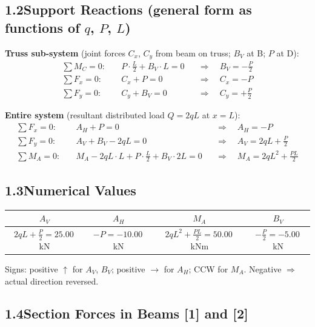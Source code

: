 \documentclass[a4paper,11pt]{article}
\begin{document}
\subsection*{1.2\quad Support Reactions (general form as functions of $q$, $P$, $L$)}

\textbf{Truss sub-system}
(joint forces $C_x$, $C_y$ from beam on truss; $B_V$ at B; $P$ at D):
\begin{align*}
  \sum M_C = 0:\quad & P \cdot \tfrac{L}{2} + B_V \cdot L = 0
    &&\Rightarrow\quad \boxed{B_V = -\tfrac{P}{2}} \\
  \sum F_x = 0:\quad & C_x + P = 0
    &&\Rightarrow\quad C_x = -P \\
  \sum F_y = 0:\quad & C_y + B_V = 0
    &&\Rightarrow\quad C_y = +\tfrac{P}{2}
\end{align*}

\textbf{Entire system} (resultant distributed load $Q = 2qL$ at $x = L$):
\begin{align*}
  \sum F_x = 0:\quad & A_H + P = 0
    &&\Rightarrow\quad \boxed{A_H = -P} \\
  \sum F_y = 0:\quad & A_V + B_V - 2qL = 0
    &&\Rightarrow\quad \boxed{A_V = 2qL + \tfrac{P}{2}} \\
  \sum M_A = 0:\quad & M_A - 2qL \cdot L + P\cdot\tfrac{L}{2} + B_V \cdot 2L = 0
    &&\Rightarrow\quad \boxed{M_A = 2qL^2 + \tfrac{PL}{2}}
\end{align*}

\subsection*{1.3\quad Numerical Values}

\begin{center}
\begin{tabular}{cccc}
\toprule
$A_V$ & $A_H$ & $M_A$ & $B_V$ \\
\midrule
$2qL + \tfrac{P}{2} = \mathbf{25.00}$\,kN
& $-P = \mathbf{-10.00}$\,kN
& $2qL^2 + \tfrac{PL}{2} = \mathbf{50.00}$\,kNm
& $-\tfrac{P}{2} = \mathbf{-5.00}$\,kN \\
\bottomrule
\end{tabular}
\end{center}

Signs: positive $\uparrow$ for $A_V$, $B_V$; positive $\rightarrow$ for $A_H$;
CCW for $M_A$. Negative $\Rightarrow$ actual direction reversed.

\subsection*{1.4\quad Section Forces in Beams [1] and [2]}
\end{document}
